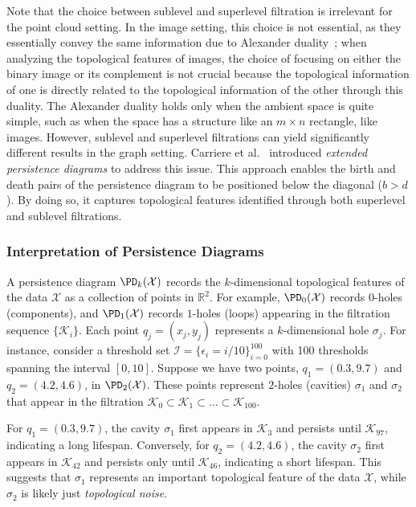 Note that the choice between sublevel and superlevel filtration is irrelevant for the point cloud setting. In the image setting, this choice is not essential, as they essentially convey the same information due to Alexander duality~\cite{hatcher2002algebraic}; when analyzing the topological features of images, the choice of focusing on either the binary image or its complement is not crucial because the topological information of one is directly related to the topological information of the other through this duality. The Alexander duality holds only when the ambient space is quite simple, such as when the space has a structure like an $ m \times n $ rectangle, like images. However, sublevel and superlevel filtrations can yield significantly different results in the graph setting. Carriere et al.~\cite{carriere2020perslay} introduced \textit{extended persistence diagrams} to address this issue.  
This approach enables the birth and death pairs of the persistence diagram to be positioned below the diagonal ($b > d$). By doing so, it captures topological features identified through both superlevel and sublevel filtrations.

 
 
\vspace{-.1in}

 

\subsubsection{Interpretation of Persistence Diagrams}
A persistence diagram $\PD_k(\mathcal{X})$ records the $k$-dimensional topological features of the data $\mathcal{X}$ as a collection of points in $\mathbb{R}^2$. For example, $\PD_0(\mathcal{X})$ records $0$-holes (components), and $\PD_1(\mathcal{X})$ records $1$-holes (loops) appearing in the filtration sequence $\{\mathcal{K}_i\}$. Each point $q_j = (x_j, y_j)$ represents a $k$-dimensional hole $\sigma_j$. For instance, consider a threshold set $\mathcal{I} = \{\epsilon_i = i/10\}_{i=0}^{100}$ with 100 thresholds spanning the interval $[0, 10]$. Suppose we have two points, $q_1 = (0.3, 9.7)$ and $q_2 = (4.2, 4.6)$, in $\PD_2(\mathcal{X})$. These points represent $2$-holes (cavities) $\sigma_1$ and $\sigma_2$ that appear in the filtration $\mathcal{K}_0 \subset \mathcal{K}_1 \subset \dots \subset \mathcal{K}_{100}$.

For $q_1 = (0.3, 9.7)$, the cavity $\sigma_1$ first appears in $\mathcal{K}_3$ and persists until $\mathcal{K}_{97}$, indicating a long lifespan. Conversely, for $q_2 = (4.2, 4.6)$, the cavity $\sigma_2$ first appears in $\mathcal{K}_{42}$ and persists only until $\mathcal{K}_{46}$, indicating a short lifespan. This suggests that $\sigma_1$ represents an important topological feature of the data $\mathcal{X}$, while $\sigma_2$ is likely just \textit{topological noise}.

